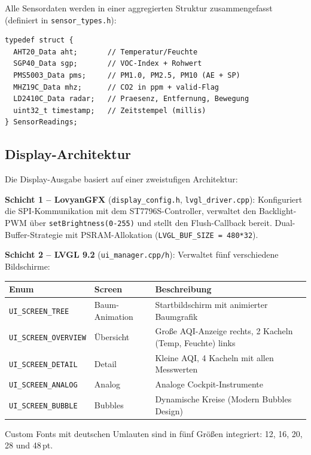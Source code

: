 \documentclass[a4paper,11pt]{article}
\begin{document}
Alle Sensordaten werden in einer aggregierten Struktur zusammengefasst (definiert in \texttt{sensor\_types.h}):

\begin{lstlisting}
typedef struct {
  AHT20_Data aht;       // Temperatur/Feuchte
  SGP40_Data sgp;       // VOC-Index + Rohwert
  PMS5003_Data pms;     // PM1.0, PM2.5, PM10 (AE + SP)
  MHZ19C_Data mhz;      // CO2 in ppm + valid-Flag
  LD2410C_Data radar;   // Praesenz, Entfernung, Bewegung
  uint32_t timestamp;   // Zeitstempel (millis)
} SensorReadings;
\end{lstlisting}

\subsection{Display-Architektur}

Die Display-Ausgabe basiert auf einer zweistufigen Architektur:

\textbf{Schicht 1 -- LovyanGFX} (\texttt{display\_config.h}, \texttt{lvgl\_driver.cpp}): Konfiguriert die SPI-Kommunikation mit dem ST7796S-Controller, verwaltet den Backlight-PWM über \texttt{setBrightness(0-255)} und stellt den Flush-Callback bereit. Dual-Buffer-Strategie mit PSRAM-Allokation (\texttt{LVGL\_BUF\_SIZE = 480*32}).

\textbf{Schicht 2 -- LVGL 9.2} (\texttt{ui\_manager.cpp/h}): Verwaltet fünf verschiedene Bildschirme:

\begin{tabularx}{\textwidth}{llX}
\toprule
\rowcolor{tableheader}
\textbf{Enum} & \textbf{Screen} & \textbf{Beschreibung} \\
\midrule
\texttt{UI\_SCREEN\_TREE} & Baum-Animation & Startbildschirm mit animierter Baumgrafik \\
\texttt{UI\_SCREEN\_OVERVIEW} & Übersicht & Große AQI-Anzeige rechts, 2 Kacheln (Temp, Feuchte) links \\
\texttt{UI\_SCREEN\_DETAIL} & Detail & Kleine AQI, 4 Kacheln mit allen Messwerten \\
\texttt{UI\_SCREEN\_ANALOG} & Analog & Analoge Cockpit-Instrumente \\
\texttt{UI\_SCREEN\_BUBBLE} & Bubbles & Dynamische Kreise (Modern Bubbles Design) \\
\bottomrule
\end{tabularx}

Custom Fonts mit deutschen Umlauten sind in fünf Größen integriert: 12, 16, 20, 28 und 48\,pt.
\end{document}
